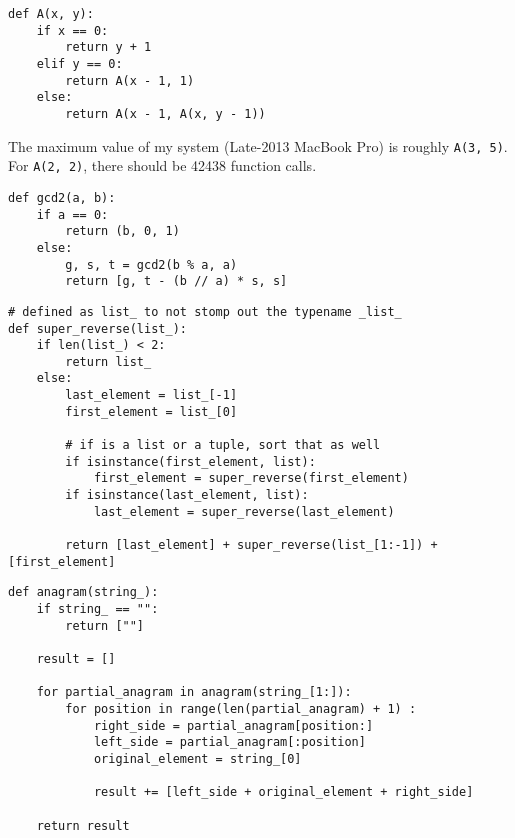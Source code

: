 \documentclass[12pt]{scrartcl}
\begin{document}
\begin{lstlisting}
def A(x, y):
    if x == 0:
        return y + 1
    elif y == 0:
        return A(x - 1, 1)
    else:
        return A(x - 1, A(x, y - 1))
\end{lstlisting}

The maximum value of my system (Late-2013 MacBook Pro) is roughly \verb|A(3, 5)|. For \verb|A(2, 2)|, there should be \num{42438} function calls.

\problem{}
\begin{lstlisting}
def gcd2(a, b):
    if a == 0:
        return (b, 0, 1)
    else:
        g, s, t = gcd2(b % a, a)
        return [g, t - (b // a) * s, s]
\end{lstlisting}

\problem{}
\begin{lstlisting}
# defined as list_ to not stomp out the typename _list_
def super_reverse(list_):
    if len(list_) < 2:
        return list_
    else:
        last_element = list_[-1]
        first_element = list_[0]

        # if is a list or a tuple, sort that as well
        if isinstance(first_element, list):
            first_element = super_reverse(first_element)
        if isinstance(last_element, list):
            last_element = super_reverse(last_element)

        return [last_element] + super_reverse(list_[1:-1]) + [first_element]
\end{lstlisting}

\problem{}
\begin{lstlisting}
def anagram(string_):
    if string_ == "":
        return [""]

    result = []

    for partial_anagram in anagram(string_[1:]):
        for position in range(len(partial_anagram) + 1) :
            right_side = partial_anagram[position:]
            left_side = partial_anagram[:position]
            original_element = string_[0]

            result += [left_side + original_element + right_side]

    return result
\end{lstlisting}
\end{document}
